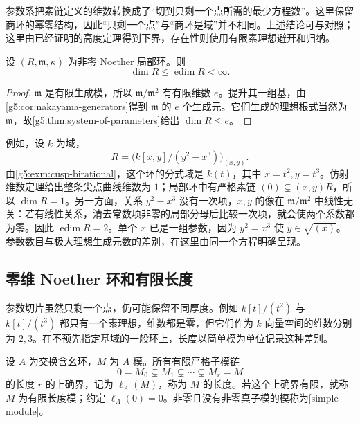 参数系把素链定义的维数转换成了“切到只剩一个点所需的最少方程数”。这里保留商环的幂零结构，因此“只剩一个点”与“商环是域”并不相同。上述结论可与\cite[第13节，定理13.4--13.6；第14节开头]{Matsumura1989}对照；这里由已经证明的高度定理得到下界，存在性则使用有限素理想避开和归纳。

\begin{proposition}
\label{g5:prop:dimension-embedding-bound}
	设 \((R,\mathfrak m,\kappa)\) 为非零 Noether 局部环。则
	\[
		\dim R\leq\operatorname{edim}R<\infty.
	\]
\end{proposition}
\begin{proof}
	\(\mathfrak m\) 是有限生成模，所以 \(\mathfrak m/\mathfrak m^2\) 有有限维数 \(e\)。提升其一组基，由\cref{g5:cor:nakayama-generators}得到 \(\mathfrak m\) 的 \(e\) 个生成元。它们生成的理想根式当然为 \(\mathfrak m\)，故\cref{g5:thm:system-of-parameters}给出 \(\dim R\leq e\)。
\end{proof}

例如，设 \(k\) 为域，
\[
	R=\bigl(k[x,y]/(y^2-x^3)\bigr)_{(x,y)}.
\]
由\cref{g5:exm:cusp-birational}，这个环的分式域是 \(k(t)\)，其中 \(x=t^2,y=t^3\)。仿射维数定理给出整条尖点曲线维数为 \(1\)；局部环中有严格素链 \((0)\subsetneq(x,y)R\)，所以 \(\dim R=1\)。另一方面，关系 \(y^2-x^3\) 没有一次项，\(x,y\) 的像在 \(\mathfrak m/\mathfrak m^2\) 中线性无关：若有线性关系，清去常数项非零的局部分母后比较一次项，就会使两个系数都为零。因此 \(\operatorname{edim}R=2\)。单个 \(x\) 已是一组参数，因为 \(y^2=x^3\) 使 \(y\in\sqrt{(x)}\)。参数数目与极大理想生成元数的差别，在这里由同一个方程明确呈现。

\subsection{零维 Noether 环和有限长度}
\label{g5:subsec:0304:02}

参数切片虽然只剩一个点，仍可能保留不同厚度。例如 \(k[t]/(t^2)\) 与 \(k[t]/(t^3)\) 都只有一个素理想，维数都是零，但它们作为 \(k\) 向量空间的维数分别为 \(2,3\)。在不预先指定基域的一般环上，长度以简单模为单位记录这种差别。

\begin{definition}
\label{g5:def:module-length}
	设 \(A\) 为交换含幺环，\(M\) 为 \(A\) 模。所有有限严格子模链
	\[
		0=M_0\subsetneq M_1\subsetneq\cdots\subsetneq M_r=M
	\]
	的长度 \(r\) 的上确界，记为 \(\ell_A(M)\)，称为 \(M\) 的长度。若这个上确界有限，就称 \(M\) 为有限长度模；约定 \(\ell_A(0)=0\)。非零且没有非零真子模的模称为[simple module]。
\end{definition}

